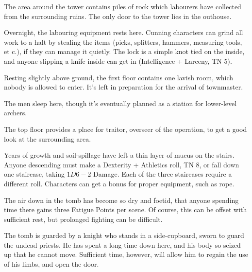 \begin{multicols}{2}

The area around the tower contains piles of rock which labourers have collected from the surrounding ruins.  The only door to the tower lies in the outhouse.


\humanfarmer


\humansoldier


Overnight, the labouring equipment rests here.  Cunning characters can grind all work to a halt by stealing the items (picks, splitters, hammers, measuring tools, et c.), if they can manage it quietly.  The lock is a simple knot tied on the inside, and anyone slipping a knife inside can get in (Intelligence + Larceny, TN 5).


Resting slightly above ground, the first floor contains one lavish room, which nobody is allowed to enter.  It's left in preparation for the arrival of \gls{townmaster}.


The men sleep here, though it's eventually planned as a station for lower-level archers.


The top floor provides a place for \gls{traitor}, overseer of the operation, to get a good look at the surrounding area.




Years of growth and soil-spillage have left a thin layer of mucus on the stairs.
Anyone descending must make a Dexterity + Athletics roll, TN 8, or fall down one staircase, taking $1D6-2$ Damage.
Each of the three staircases require a different roll.
Characters can get a bonus for proper equipment, such as rope.

The air down in the tomb has become so dry and foetid, that anyone spending time there gains three Fatigue Points per scene.
Of course, this can be offset with sufficient rest, but prolonged fighting can be difficult.

The tomb is guarded by a knight who stands in a side-cupboard, sworn to guard the undead priests.
He has spent a long time down here, and his body so seized up that he cannot move.
Sufficient time, however, will allow him to regain the use of his limbs, and open the door.


\end{multicols}
